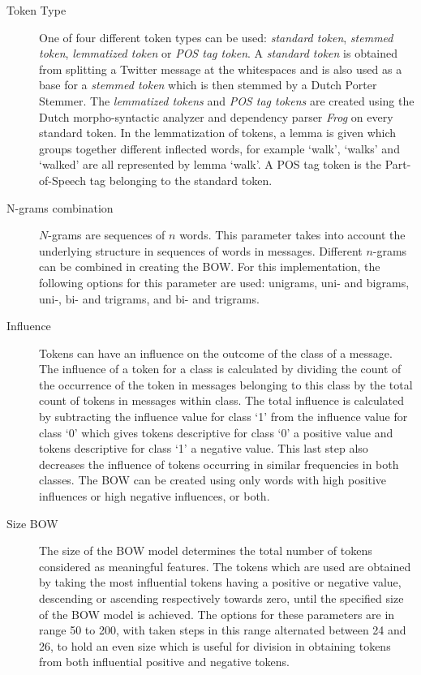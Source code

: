 \begin{description}
\item[Token Type] One of four different token types can be used: \textit{standard token}, \textit{stemmed token}, \textit{lemmatized token} or \textit{POS tag token}. A \textit{standard token} is obtained from splitting a Twitter message at the whitespaces and is also used as a base for a \textit{stemmed token} which is then stemmed by a Dutch Porter Stemmer. The \textit{lemmatized tokens} and \textit{POS tag tokens} are created using the Dutch morpho-syntactic analyzer and dependency parser \textit{Frog} \cite{frog} on every standard token. In the lemmatization of tokens, a lemma is given which groups together different inflected words, for example `walk', `walks' and `walked' are all represented by lemma `walk'. A POS tag token is the Part-of-Speech tag belonging to the standard token. 
\item[N-grams combination] $N$-grams are sequences of $n$ words. This parameter takes into account the underlying structure in sequences of words in messages. Different $n$-grams can be combined in creating the BOW. For this implementation, the following options for this parameter are used: unigrams, uni- and bigrams, uni-, bi- and trigrams, and bi- and trigrams.
\item[Influence] Tokens can have an influence on the outcome of the class of a message. The influence of a token for a class is calculated by dividing the count of the occurrence of the token in messages belonging to this class by the total count of tokens in messages within class. The total influence is calculated by subtracting the influence value for class `1' from the influence value for class `0' which gives tokens descriptive for class `0' a positive value and tokens descriptive for class `1' a negative value. This last step also decreases the influence of tokens occurring in similar frequencies in both classes. The BOW can be created using only words with high positive influences or high negative influences, or both.

\item[Size BOW] The size of the BOW model determines the total number of tokens considered as meaningful features. The tokens which are used are obtained by taking the most influential tokens having a positive or negative value, descending or ascending respectively towards zero, until the specified size of the BOW model is achieved. The options for these parameters are in range 50 to 200, with taken steps in this range alternated between 24 and 26, to hold an even size which is useful for division in obtaining tokens from both influential positive and negative tokens. 
\end{description}

